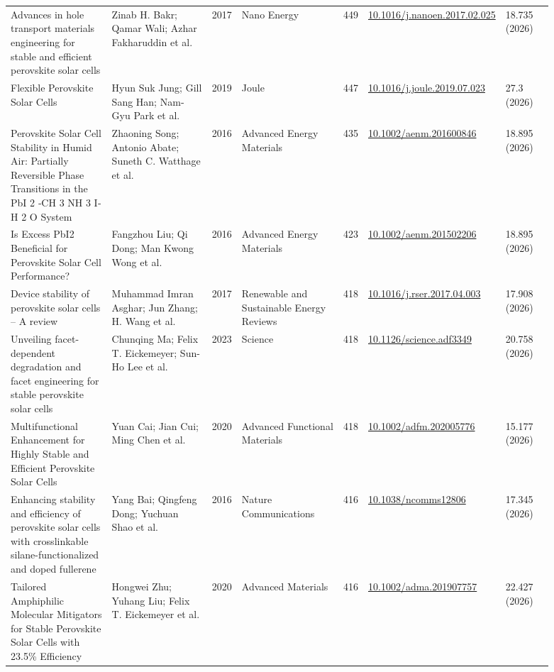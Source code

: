 \documentclass[10pt,a4paper]{article}
\begin{document}
{\begin{longtable}{p{0.197\linewidth}p{0.197\linewidth}p{0.043\linewidth}p{0.197\linewidth}p{0.043\linewidth}p{0.117\linewidth}p{0.098\linewidth}}
Advances in hole transport materials engineering for stable and efficient perovskite solar cells & Zinab H. Bakr; Qamar Wali; Azhar Fakharuddin et al. & 2017 & Nano Energy & 449 & \href{https://doi.org/10.1016/j.nanoen.2017.02.025}{10.1016/j.nanoen.2017.02.025} & 18.735 (2026) \\
Flexible Perovskite Solar Cells & Hyun Suk Jung; Gill Sang Han; Nam‐Gyu Park et al. & 2019 & Joule & 447 & \href{https://doi.org/10.1016/j.joule.2019.07.023}{10.1016/j.joule.2019.07.023} & 27.3 (2026) \\
Perovskite Solar Cell Stability in Humid Air: Partially Reversible Phase Transitions in the PbI 2 ‐CH 3 NH 3 I‐H 2 O System & Zhaoning Song; Antonio Abate; Suneth C. Watthage et al. & 2016 & Advanced Energy Materials & 435 & \href{https://doi.org/10.1002/aenm.201600846}{10.1002/aenm.201600846} & 18.895 (2026) \\
Is Excess PbI2 Beneficial for Perovskite Solar Cell Performance? & Fangzhou Liu; Qi Dong; Man Kwong Wong et al. & 2016 & Advanced Energy Materials & 423 & \href{https://doi.org/10.1002/aenm.201502206}{10.1002/aenm.201502206} & 18.895 (2026) \\
Device stability of perovskite solar cells – A review & Muhammad Imran Asghar; Jun Zhang; H. Wang et al. & 2017 & Renewable and Sustainable Energy Reviews & 418 & \href{https://doi.org/10.1016/j.rser.2017.04.003}{10.1016/j.rser.2017.04.003} & 17.908 (2026) \\
Unveiling facet-dependent degradation and facet engineering for stable perovskite solar cells & Chunqing Ma; Felix T. Eickemeyer; Sun-Ho Lee et al. & 2023 & Science & 418 & \href{https://doi.org/10.1126/science.adf3349}{10.1126/science.adf3349} & 20.758 (2026) \\
Multifunctional Enhancement for Highly Stable and Efficient Perovskite Solar Cells & Yuan Cai; Jian Cui; Ming Chen et al. & 2020 & Advanced Functional Materials & 418 & \href{https://doi.org/10.1002/adfm.202005776}{10.1002/adfm.202005776} & 15.177 (2026) \\
Enhancing stability and efficiency of perovskite solar cells with crosslinkable silane-functionalized and doped fullerene & Yang Bai; Qingfeng Dong; Yuchuan Shao et al. & 2016 & Nature Communications & 416 & \href{https://doi.org/10.1038/ncomms12806}{10.1038/ncomms12806} & 17.345 (2026) \\
Tailored Amphiphilic Molecular Mitigators for Stable Perovskite Solar Cells with 23.5\% Efficiency & Hongwei Zhu; Yuhang Liu; Felix T. Eickemeyer et al. & 2020 & Advanced Materials & 416 & \href{https://doi.org/10.1002/adma.201907757}{10.1002/adma.201907757} & 22.427 (2026) \\

\end{longtable}}
\end{document}
